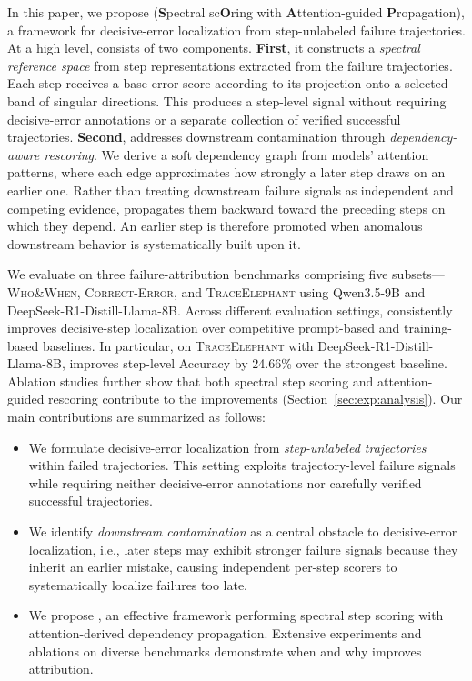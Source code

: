 In this paper, we propose \soap (\textbf{S}pectral sc\textbf{O}ring with
 \textbf{A}ttention-guided \textbf{P}ropagation), a framework for decisive-error localization from step-unlabeled failure trajectories.
At a high level, \soap consists of two components.
\textbf{First}, it constructs a \emph{spectral reference space} from step representations extracted from the failure trajectories.
Each step receives a base error score according to its projection onto a selected band of singular directions.
This produces a step-level signal without requiring decisive-error annotations or a separate collection of verified successful trajectories. \textbf{Second}, \soap addresses downstream contamination through
\emph{dependency-aware rescoring}.
We derive a soft dependency graph from models' attention patterns, where each edge approximates how strongly a later step draws on an earlier one.
Rather than treating downstream failure signals as independent and competing evidence, \soap propagates them backward toward the preceding steps on which they depend.
An earlier step is therefore promoted when anomalous downstream behavior is systematically built upon it.


We evaluate \soap on three failure-attribution benchmarks comprising five subsets---\textsc{Who\&When}, \textsc{Correct-Error}, and \textsc{TraceElephant} using Qwen3.5-9B and DeepSeek-R1-Distill-Llama-8B.
Across different evaluation settings, \soap consistently improves decisive-step localization over competitive prompt-based and training-based baselines.
In particular, on \textsc{TraceElephant} with DeepSeek-R1-Distill-Llama-8B, \soap improves step-level Accuracy by 24.66\% over the strongest baseline.
Ablation studies further show that both spectral step scoring and attention-guided rescoring contribute to the improvements (Section~\ref{sec:exp:analysis}). Our main contributions are summarized as follows:


\vspace{-1em}
\begin{itemize}
    \item We formulate decisive-error localization from
    \emph{step-unlabeled trajectories} within failed trajectories.
    This setting exploits trajectory-level failure signals while requiring neither decisive-error annotations nor carefully verified successful trajectories.

    \item We identify \emph{downstream contamination} as a central obstacle to decisive-error localization, i.e., later steps may exhibit stronger failure signals because they inherit an earlier mistake, causing independent per-step scorers to systematically localize failures too late.

    \item We propose \soap, an effective framework performing spectral step scoring with attention-derived dependency propagation.
    Extensive experiments and ablations on diverse benchmarks demonstrate when and why \soap improves attribution.
\end{itemize}





